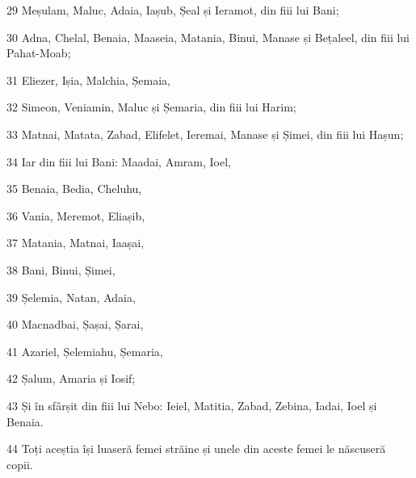 \par 29 Meșulam, Maluc, Adaia, Iașub, Șeal și Ieramot, din fiii lui Bani;
\par 30 Adna, Chelal, Benaia, Maaseia, Matania, Binui, Manase și Bețaleel, din fiii lui Pahat-Moab;
\par 31 Eliezer, Ișia, Malchia, Șemaia,
\par 32 Simeon, Veniamin, Maluc și Șemaria, din fiii lui Harim;
\par 33 Matnai, Matata, Zabad, Elifelet, Ieremai, Manase și Șimei, din fiii lui Hașun;
\par 34 Iar din fiii lui Bani: Maadai, Amram, Ioel,
\par 35 Benaia, Bedia, Cheluhu,
\par 36 Vania, Meremot, Eliașib,
\par 37 Matania, Matnai, Iaașai,
\par 38 Bani, Binui, Șimei,
\par 39 Șelemia, Natan, Adaia,
\par 40 Macnadbai, Șașai, Șarai,
\par 41 Azariel, Șelemiahu, Șemaria,
\par 42 Șalum, Amaria și Iosif;
\par 43 Și în sfârșit din fiii lui Nebo: Ieiel, Matitia, Zabad, Zebina, Iadai, Ioel și Benaia.
\par 44 Toți aceștia își luaseră femei străine și unele din aceste femei le născuseră copii.


